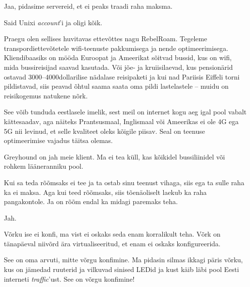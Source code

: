 
Jaa, pidasime servereid, et ei peaks traadi raha maksma.


Said Unixi \emph{account}'i ja oligi kõik.


Praegu olen sellises huvitavas ettevõttes nagu RebelRoam. 
Tegeleme transpordiettevõtetele wifi-teenuste pakkumisega ja nende 
optimeerimisega. Kliendibaasiks on mööda Euroopat ja Ameerikat 
sõitvad bussid, kus on wifi, mida bussireisijad saavad kasutada. 
Või jõe- ja kruiisilaevad, kus pensionärid ostavad 3000--4000dollarilise nädalase reisipaketi ja kui nad Pariisis Eiffeli torni 
pildistavad, siis peavad õhtul saama saata oma pildi lastelastele -- muidu on 
reisikogemus natukene nõrk. 

See võib tunduda eestlasele imelik, sest meil on internet kogu aeg igal pool 
vabalt kättesaadav, aga näiteks Prantsusmaal, Inglismaal või Ameerikas ei 
ole 4G ega 5G nii levinud, et selle kvaliteet oleks kõigile piisav. Seal 
on teenuse optimeerimise vajadus täitsa olemas.


Greyhound on jah meie klient. Ma ei tea küll, kas kõikidel bussiliinidel või rohkem 
lääneranniku pool.


Kui sa teda rõõmsaks ei tee ja ta ostab sinu teenust vihaga, siis ega ta sulle raha
ka ei maksa. Aga kui teed rõõmsaks, siis tõenäoliselt laekub ka raha 
pangakontole. Ja on rõõm endal ka midagi paremaks teha.


Jah.


Võrku ise ei konfi, ma vist ei oskaks seda enam korralikult teha. Võrk on 
tänapäeval niivõrd ära virtualiseeritud, et enam ei oskaks konfigureerida.


See on oma arvuti, mitte võrgu konfimine. Ma pidasin silmas
ikkagi päris võrku, kus on jämedad ruuterid ja vilkuvad sinised LEDid ja kust käib 
läbi pool Eesti interneti \emph{traffic}'ust. See on võrgu 
konfimine! 